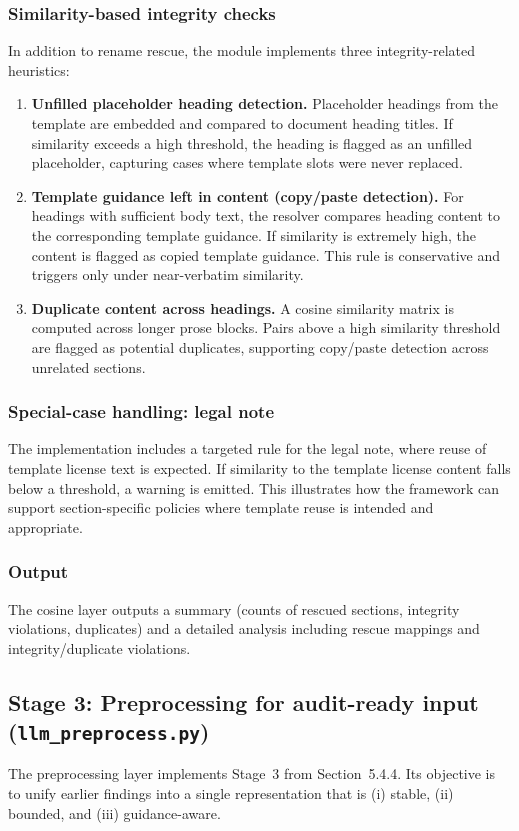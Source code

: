 \subsubsection{Similarity-based integrity checks}
In addition to rename rescue, the module implements three integrity-related heuristics:
\begin{enumerate}
    \item \textbf{Unfilled placeholder heading detection.} Placeholder headings from the template are embedded and compared to document heading titles. If similarity exceeds a high threshold, the heading is flagged as an unfilled placeholder, capturing cases where template slots were never replaced.
    \item \textbf{Template guidance left in content (copy/paste detection).} For headings with sufficient body text, the resolver compares heading content to the corresponding template guidance. If similarity is extremely high, the content is flagged as copied template guidance. This rule is conservative and triggers only under near-verbatim similarity.
    \item \textbf{Duplicate content across headings.} A cosine similarity matrix is computed across longer prose blocks. Pairs above a high similarity threshold are flagged as potential duplicates, supporting copy/paste detection across unrelated sections.
\end{enumerate}

\subsubsection{Special-case handling: legal note}
The implementation includes a targeted rule for the legal note, where reuse of template license text is expected. If similarity to the template license content falls below a threshold, a warning is emitted. This illustrates how the framework can support section-specific policies where template reuse is intended and appropriate.

\subsubsection{Output}
The cosine layer outputs a summary (counts of rescued sections, integrity violations, duplicates) and a detailed analysis including rescue mappings and integrity/duplicate violations.

\subsection{Stage 3: Preprocessing for audit-ready input (\texttt{llm\_preprocess.py})}
The preprocessing layer implements Stage~3 from Section~5.4.4. Its objective is to unify earlier findings into a single representation that is (i) stable, (ii) bounded, and (iii) guidance-aware.

